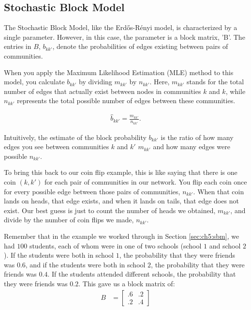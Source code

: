 \subsection{Stochastic Block Model}

The Stochastic Block Model, like the Erdős-Rényi model, is characterized by a single parameter. However, in this case, the parameter is a block matrix, 'B'. The entries in $B$, $b_{kk'}$, denote the probabilities of edges existing between pairs of communities. 

When you apply the Maximum Likelihood Estimation (MLE) method to this model, you calculate $b_{kk'}$ by dividing $m_{kk'}$ by $n_{kk'}$. Here, $m_{kk'}$ stands for the total number of edges that actually exist between nodes in communities $k$ and $k$, while $n_{kk'}$ represents the total possible number of edges between these communities.

\begin{align*}
    \hat b_{kk'} = \frac{m_{kk'}}{n_{kk'}}.
\end{align*}

Intuitively, the estimate of the block probability $b_{kk'}$ is the ratio of how many edges you see between communities $k$ and $k'$ $m_{kk'}$ and how many edges were possible $n_{kk'}$.

To bring this back to our coin flip example, this is like saying that there is one coin $(k, k')$ for each pair of communities in our network. You flip each coin once for every possible edge between those pairs of communities, $n_{kk'}$. When that coin lands on heads, that edge exists, and when it lands on tails, that edge does not exist. Our best guess is just to count the number of heads we obtained, $m_{kk'}$, and divide by the number of coin flips we made, $n_{kk'}$. 

Remember that in the example we worked through in Section \ref{sec:ch5:sbm}, we had $100$ students, each of whom were in one of two schools (school $1$ and school $2$). If the students were both in school $1$, the probability that they were friends was $0.6$, and if the students were both in school $2$, the probability that they were friends was $0.4$. If the students attended different schools, the probability that they were friends was $0.2$. This gave us a block matrix of:
\begin{align*}
    B &= \begin{bmatrix}
        .6 & .2 \\
        .2 & .4
    \end{bmatrix}
\end{align*}

